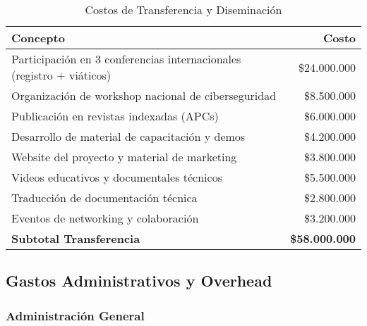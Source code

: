 \begin{table}[H]
    \centering
    \caption{Costos de Transferencia y Diseminación}
    \label{tab:diseminacion}
    \small
    \begin{tabular}{|l|r|}
        \hline
        \textbf{Concepto} & \textbf{Costo} \\
        \hline
        Participación en 3 conferencias internacionales (registro + viáticos) & \$24.000.000 \\
        \hline
        Organización de workshop nacional de ciberseguridad & \$8.500.000 \\
        \hline
        Publicación en revistas indexadas (APCs) & \$6.000.000 \\
        \hline
        Desarrollo de material de capacitación y demos & \$4.200.000 \\
        \hline
        Website del proyecto y material de marketing & \$3.800.000 \\
        \hline
        Videos educativos y documentales técnicos & \$5.500.000 \\
        \hline
        Traducción de documentación técnica & \$2.800.000 \\
        \hline
        Eventos de networking y colaboración & \$3.200.000 \\
        \hline
        \textbf{Subtotal Transferencia} & \textbf{\$58.000.000} \\
        \hline
    \end{tabular}
\end{table}

\subsection{Gastos Administrativos y Overhead}

\subsubsection{Administración General}

